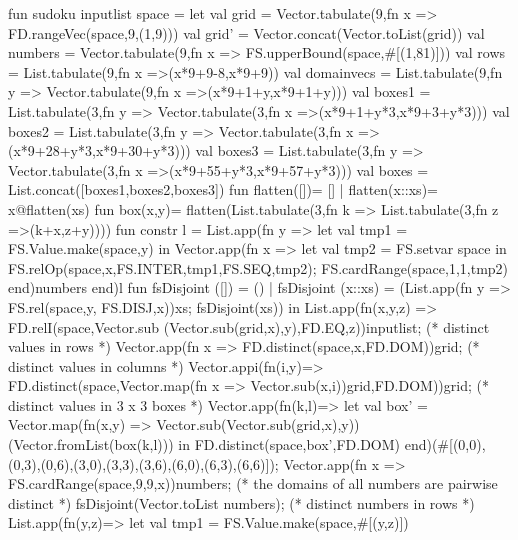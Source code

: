 \documentclass[a4paper,halfparskip]{scrartcl}
\begin{document}
\begin{myverbatim}
fun sudoku inputlist space = 
  let
     val grid = Vector.tabulate(9,fn x => 
                         FD.rangeVec(space,9,(1,9)))
     val grid' = Vector.concat(Vector.toList(grid))
     val numbers = Vector.tabulate(9,fn x => 
                         FS.upperBound(space,#[(1,81)]))
     val rows = List.tabulate(9,fn x =>(x*9+9-8,x*9+9)) 
     val domainvecs = List.tabulate(9,fn y => 
                       Vector.tabulate(9,fn x =>(x*9+1+y,x*9+1+y)))
     val boxes1 = List.tabulate(3,fn y => 
                   Vector.tabulate(3,fn x =>(x*9+1+y*3,x*9+3+y*3)))
     val boxes2 = List.tabulate(3,fn y => 
                   Vector.tabulate(3,fn x =>(x*9+28+y*3,x*9+30+y*3)))
     val boxes3 = List.tabulate(3,fn y => 
                   Vector.tabulate(3,fn x =>(x*9+55+y*3,x*9+57+y*3)))
     val boxes = List.concat([boxes1,boxes2,boxes3])
     fun flatten([])= []
       | flatten(x::xs)= x@flatten(xs)
     fun box(x,y)= flatten(List.tabulate(3,fn k => 
                            List.tabulate(3,fn z =>(k+x,z+y))))
     fun constr l = 
       List.app(fn y => 
           let
              val tmp1 = FS.Value.make(space,y)
           in
              Vector.app(fn x => 
                  let 
                     val tmp2 = FS.setvar space 
                  in
                     FS.relOp(space,x,FS.INTER,tmp1,FS.SEQ,tmp2);
                     FS.cardRange(space,1,1,tmp2)
                  end)numbers
           end)l 
     fun fsDisjoint ([]) = ()
       | fsDisjoint (x::xs) = 
            (List.app(fn y => FS.rel(space,y, FS.DISJ,x))xs;
             fsDisjoint(xs))           
  in
     List.app(fn(x,y,z) => FD.relI(space,Vector.sub
                          (Vector.sub(grid,x),y),FD.EQ,z))inputlist;
    (* distinct values in rows *)
     Vector.app(fn x => FD.distinct(space,x,FD.DOM))grid;
    (* distinct values in columns *)
     Vector.appi(fn(i,y)=> FD.distinct(space,Vector.map(fn x => 
                                  Vector.sub(x,i))grid,FD.DOM))grid;
    (* distinct values in 3 x 3 boxes *)
     Vector.app(fn(k,l)=> 
       let
          val box' = Vector.map(fn(x,y) => 
                              Vector.sub(Vector.sub(grid,x),y))
                       (Vector.fromList(box(k,l)))
       in
          FD.distinct(space,box',FD.DOM)
      end)(#[(0,0),(0,3),(0,6),(3,0),(3,3),(3,6),(6,0),(6,3),(6,6)]);
     Vector.app(fn x => FS.cardRange(space,9,9,x))numbers;
    (* the domains of all numbers are pairwise distinct *)
     fsDisjoint(Vector.toList numbers);
    (* distinct numbers in rows *)
     List.app(fn(y,z)=>
        let 
           val tmp1 = FS.Value.make(space,#[(y,z)]) 

\end{myverbatim}
\end{document}
